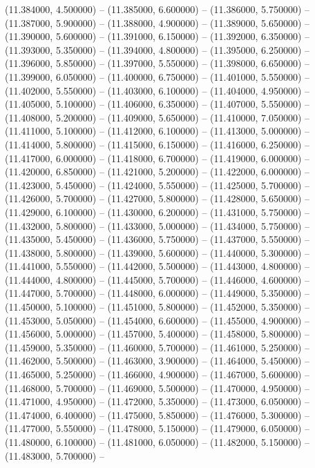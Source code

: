 (11.384000, 4.500000) -- 
(11.385000, 6.600000) -- 
(11.386000, 5.750000) -- 
(11.387000, 5.900000) -- 
(11.388000, 4.900000) -- 
(11.389000, 5.650000) -- 
(11.390000, 5.600000) -- 
(11.391000, 6.150000) -- 
(11.392000, 6.350000) -- 
(11.393000, 5.350000) -- 
(11.394000, 4.800000) -- 
(11.395000, 6.250000) -- 
(11.396000, 5.850000) -- 
(11.397000, 5.550000) -- 
(11.398000, 6.650000) -- 
(11.399000, 6.050000) -- 
(11.400000, 6.750000) -- 
(11.401000, 5.550000) -- 
(11.402000, 5.550000) -- 
(11.403000, 6.100000) -- 
(11.404000, 4.950000) -- 
(11.405000, 5.100000) -- 
(11.406000, 6.350000) -- 
(11.407000, 5.550000) -- 
(11.408000, 5.200000) -- 
(11.409000, 5.650000) -- 
(11.410000, 7.050000) -- 
(11.411000, 5.100000) -- 
(11.412000, 6.100000) -- 
(11.413000, 5.000000) -- 
(11.414000, 5.800000) -- 
(11.415000, 6.150000) -- 
(11.416000, 6.250000) -- 
(11.417000, 6.000000) -- 
(11.418000, 6.700000) -- 
(11.419000, 6.000000) -- 
(11.420000, 6.850000) -- 
(11.421000, 5.200000) -- 
(11.422000, 6.000000) -- 
(11.423000, 5.450000) -- 
(11.424000, 5.550000) -- 
(11.425000, 5.700000) -- 
(11.426000, 5.700000) -- 
(11.427000, 5.800000) -- 
(11.428000, 5.650000) -- 
(11.429000, 6.100000) -- 
(11.430000, 6.200000) -- 
(11.431000, 5.750000) -- 
(11.432000, 5.800000) -- 
(11.433000, 5.000000) -- 
(11.434000, 5.750000) -- 
(11.435000, 5.450000) -- 
(11.436000, 5.750000) -- 
(11.437000, 5.550000) -- 
(11.438000, 5.800000) -- 
(11.439000, 5.600000) -- 
(11.440000, 5.300000) -- 
(11.441000, 5.550000) -- 
(11.442000, 5.500000) -- 
(11.443000, 4.800000) -- 
(11.444000, 4.800000) -- 
(11.445000, 5.700000) -- 
(11.446000, 4.600000) -- 
(11.447000, 5.700000) -- 
(11.448000, 6.000000) -- 
(11.449000, 5.350000) -- 
(11.450000, 5.100000) -- 
(11.451000, 5.800000) -- 
(11.452000, 5.350000) -- 
(11.453000, 5.050000) -- 
(11.454000, 6.600000) -- 
(11.455000, 4.900000) -- 
(11.456000, 5.000000) -- 
(11.457000, 5.400000) -- 
(11.458000, 5.800000) -- 
(11.459000, 5.350000) -- 
(11.460000, 5.700000) -- 
(11.461000, 5.250000) -- 
(11.462000, 5.500000) -- 
(11.463000, 3.900000) -- 
(11.464000, 5.450000) -- 
(11.465000, 5.250000) -- 
(11.466000, 4.900000) -- 
(11.467000, 5.600000) -- 
(11.468000, 5.700000) -- 
(11.469000, 5.500000) -- 
(11.470000, 4.950000) -- 
(11.471000, 4.950000) -- 
(11.472000, 5.350000) -- 
(11.473000, 6.050000) -- 
(11.474000, 6.400000) -- 
(11.475000, 5.850000) -- 
(11.476000, 5.300000) -- 
(11.477000, 5.550000) -- 
(11.478000, 5.150000) -- 
(11.479000, 6.050000) -- 
(11.480000, 6.100000) -- 
(11.481000, 6.050000) -- 
(11.482000, 5.150000) -- 
(11.483000, 5.700000) -- 
